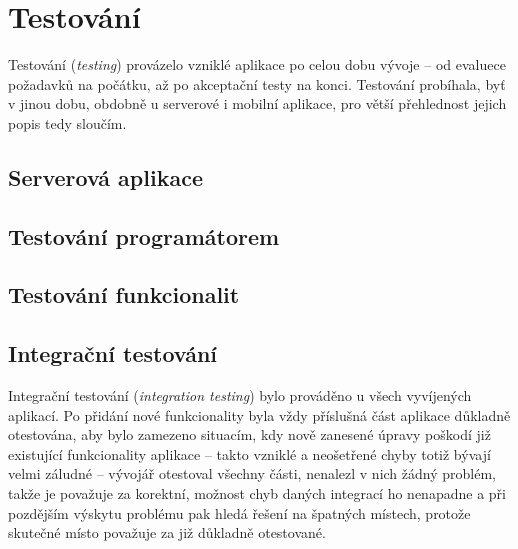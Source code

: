 
\chapter{Testování}
Testování (\textit{testing}) provázelo vzniklé aplikace po celou dobu vývoje -- od evaluece požadavků na počátku, až po akceptační testy na konci. Testování probíhala, byť v jinou dobu, obdobně u serverové i mobilní aplikace, pro větší přehlednost jejich popis tedy sloučím.

\section{Serverová aplikace}

\section{Testování programátorem}


\section{Testování funkcionalit}

\section{Integrační testování}
Integrační testování (\textit{integration testing}) bylo prováděno u všech vyvíjených aplikací. Po přidání nové funkcionality byla vždy příslušná část aplikace důkladně otestována, aby bylo zamezeno situacím, kdy nově zanesené úpravy poškodí již existující funkcionality aplikace -- takto vzniklé a neošetřené chyby totiž bývají velmi záludné -- vývojář otestoval všechny části, nenalezl v nich žádný problém, takže je považuje za korektní, možnost chyb daných integrací ho nenapadne a při pozdějším výskytu problému pak hledá řešení na špatných místech, protože skutečné místo považuje za již důkladně otestované.

